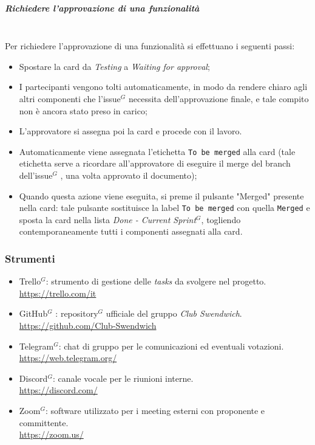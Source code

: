 \subparagraph{Richiedere l'approvazione di una funzionalità}
\mbox{}\\
Per richiedere l'approvazione di una funzionalità si effettuano i seguenti passi:
\begin{itemize}
    \item Spostare la card da \textit{Testing} a \textit{Waiting for approval};
    \item I partecipanti vengono tolti automaticamente, in modo da rendere chiaro agli altri componenti che l'issue$^G$  necessita dell'approvazione finale, e tale compito non è ancora stato preso in carico;
    \item L'approvatore si assegna poi la card e procede con il lavoro.
    \item Automaticamente viene assegnata l'etichetta \texttt{To be merged} alla card (tale etichetta serve a ricordare all'approvatore di eseguire il merge del branch dell'issue$^G$ , una volta approvato il documento);
    \item Quando questa azione viene eseguita, si preme il pulsante "Merged" presente nella card: tale pulsante sostituisce la label \texttt{To be merged} con quella \texttt{Merged} e sposta la card nella lista \textit{Done - Current Sprint}$^G$, togliendo contemporaneamente tutti i componenti assegnati alla card.
\end{itemize}

\subsubsection{Strumenti}

\begin{itemize}
    \item Trello$^G$: strumento di gestione delle \textit{tasks} da svolgere nel progetto. \\
    \href{https://trello.com/it}{https://trello.com/it}
    \item GitHub$^G$ : repository$^G$  ufficiale del gruppo \textit{Club Swendwich}.\\
    \href{https://github.com/Club-Swendwich}{https://github.com/Club-Swendwich}
    \item Telegram$^{G}$: chat di gruppo per le comunicazioni ed eventuali votazioni. \\
    \href{https://web.telegram.org/}{https://web.telegram.org/}
    \item Discord$^{G}$: canale vocale per le riunioni interne.\\
    \href{https://discord.com/}{https://discord.com/}
    \item Zoom$^{G}$: software utilizzato per i meeting esterni con proponente e committente.\\
    \href{https://zoom.us/}{https://zoom.us/}
\end{itemize}
